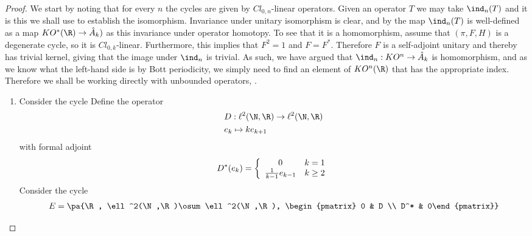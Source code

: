 \begin{proof}
We start by noting that for every $n$ the cycles are given by $Cl_{0,n}$-linear operators. Given an operator $T$ we may take $\ind_n(T)$ and it is this we shall use to establish the isomorphism. Invariance under unitary isomorphism is clear, and by  the map $\ind_n(T)$ is well-defined as a map $KO^*(\R)\to \hat{A}_k)$ as this invariance under operator homotopy.
To see that it is a homomorphism, assume that $(\pi,F,H)$ is a degenerate cycle, so it is $Cl_{0,k}$-linear. Furthermore, this implies that $F^2=1$ and $F=F^*$. Therefore $F$ is a self-adjoint unitary and thereby has trivial kernel, giving that the image under $\ind_n$ is trivial. 
As such, we have argued that $\ind_n: KO^n\to \hat{A}_k$ is homomorphism, and as we know what the left-hand side is by Bott periodicity, we simply need to find an element of $KO^n(\R)$ that has the appropriate index. Therefore we shall be working directly with unbounded operators, . 
\begin{enumerate}
\item
	Consider the cycle 
	Define the operator 
	\begin{align*}
		&D:\ell^2(\N,\R)\to \ell^2(\N,\R) \\
		&e_k\mapsto ke_{k+1}
	\end{align*}
	with formal adjoint 
	\begin{align*}
		D^*(e_k)=\left \{\begin{array}{c c} 0 & k=1 \\ \frac{1}{k-1}e_{k-1} &  k\geq 2 \end{array} \right .
	\end{align*}
	Consider the cycle 
	\begin{align*}
		E=\pa{\R, \ell^2(\N,\R)\osum \ell^2(\N,\R), \begin{pmatrix} 0 & D \\ D^* & 0\end{pmatrix}}

\end{align*}
\end{enumerate}
\end{proof}

